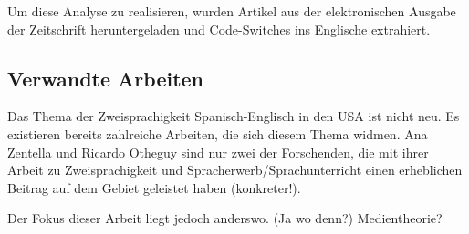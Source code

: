 Um diese Analyse zu realisieren, wurden Artikel aus der elektronischen Ausgabe der Zeitschrift heruntergeladen und Code-Switches ins Englische extrahiert.

\subsection{Verwandte Arbeiten}

Das Thema der Zweisprachigkeit Spanisch-Englisch in den USA ist nicht neu.
Es existieren bereits zahlreiche Arbeiten, die sich diesem Thema widmen.
Ana Zentella und Ricardo Otheguy sind nur zwei der Forschenden, die mit ihrer Arbeit zu Zweisprachigkeit und Spracherwerb/Sprachunterricht einen erheblichen Beitrag auf dem Gebiet geleistet haben (konkreter!).

Der Fokus dieser Arbeit liegt jedoch anderswo. (Ja wo denn?)
Medientheorie?

